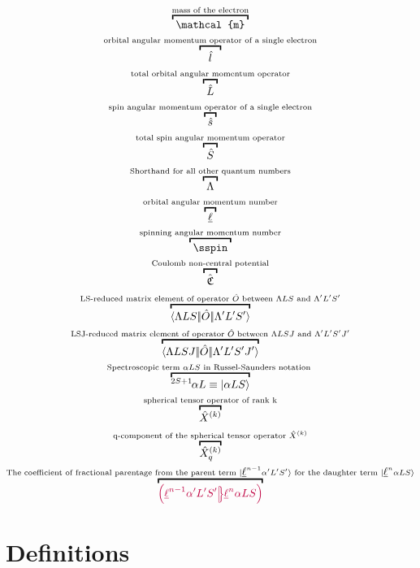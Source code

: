 \documentclass{article}
\begin{document}
\begin{gather}
    \overbracket{\,\,\mathcal{m}\,\,}^{\text{mass of the electron}} \\
    \overbracket{\,\,\,\,\,\op{l}\,\,\,\,\,}^{\text{orbital angular momentum operator of a single electron}} \\
    \overbracket{\,\,\op{L}\,\,}^{\text{total orbital angular momentum  operator}} \\
    \overbracket{\,\,\op{s}\,\,}^{\text{spin angular momentum  operator of a single electron}} \\
    \overbracket{\,\,\op{S}\,\,}^{\text{total spin angular momentum operator}} \\
    \overbracket{\,\,\Lambda\,\,}^{\text{Shorthand for all other quantum numbers}} \\ 
    \overbracket{\,\,\lorb\,\,}^{\text{orbital angular momentum number}} \\
    \overbracket{\,\,\sspin\,\,}^{\text{spinning angular momentum number}} \\
    \overbracket{\,\,\CoulombNonCentral\,\,}^{\text{Coulomb non-central potential}} \\
    \overbracket{\redbraopket{\Lambda LS}{\op{O}}{\Lambda' L'S'}}^{\text{LS-reduced matrix element of operator }\hat{O}\text{ between }{\Lambda LS} \text{ and } {\Lambda' L'S'}} \\
    \overbracket{\redbraopket{\Lambda LSJ}{\op{O}}{\Lambda' L'S'J'}}^{\text{LSJ-reduced matrix element of operator }\hat{O}\text{ between }{\Lambda LSJ} \text{ and } {\Lambda' L'S'J'}} \\
    \overbracket{\LSterm{2 S + 1}{\alpha{L}}\equiv \ket{\alpha{LS}}}^{\text{Spectroscopic term } {\alpha{LS}} \text{ in Russel-Saunders notation }} \\
    \overbracket{\op{X}^{(k)}}^{\text{spherical tensor operator of rank k}} \\
    \overbracket{\op{X}_q^{(k)}}^{\text{q-component of the spherical tensor operator }\op{X}^{(k)}} \\
    \overbracket{\cfp{\lorb^{n-1}\alpha'L'S'}{\lorb^n\alpha{L}{S}}}^{\text{The coefficient of fractional parentage from the parent term }\ket{\lorb^{n-1}\alpha'{L'S'}}\text{ for the daughter term }\ket{\lorb^{n}\alpha{LS}}}  
\end{gather}

\section{Definitions}  
\end{document}
